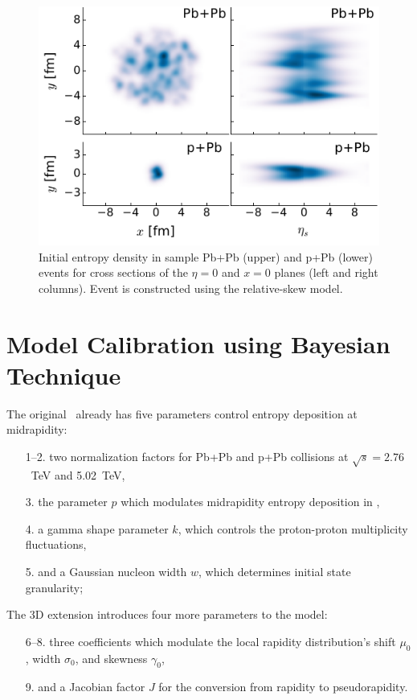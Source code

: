 \documentclass[3p,times,twocolumn]{elsarticle}
\begin{document}
\begin{figure}
\includegraphics[width=\columnwidth]{trento3d_example.pdf}
\caption{\label{fig:trento} Initial entropy density in sample Pb+Pb (upper) and p+Pb (lower) events for cross sections of the $\eta=0$ and $x=0$ planes (left and right columns). Event is constructed using the relative-skew model.}
\end{figure}

\section{Model Calibration using Bayesian Technique}
The original \trento~already has five parameters control entropy deposition at midrapidity:
\begin{enumerate}
  \item[1--2.] two normalization factors for Pb+Pb and p+Pb collisions at $\sqrt{s}=2.76$~TeV and 5.02~TeV,
  \item[3.] the parameter $p$ which modulates midrapidity entropy deposition in \trento,
  \item[4.] a gamma shape parameter $k$, which controls the proton-proton multiplicity fluctuations,
  \item[5.] and a Gaussian nucleon width $w$, which determines initial state granularity;
\end{enumerate}
The 3D extension introduces four more parameters to the model:
\begin{enumerate}
  \setcounter{enumi}{6}
  \item[6--8.] three coefficients which modulate the local rapidity distribution's shift $\mu_0$, width $\sigma_0$, and skewness $\gamma_0$,
  \item[9.] and a Jacobian factor $J$ for the conversion from rapidity to pseudorapidity.
\end{enumerate}
\end{document}
